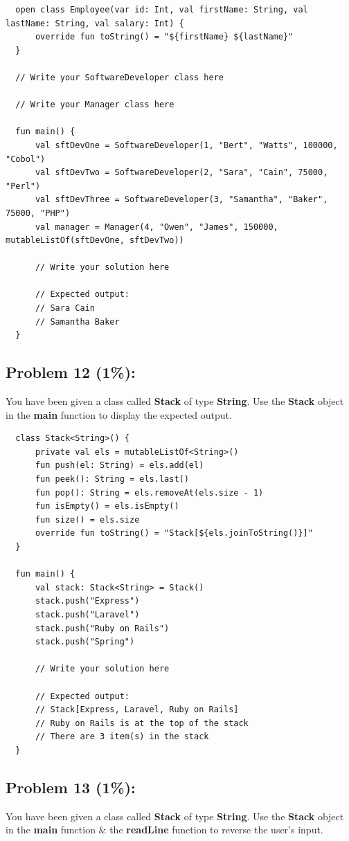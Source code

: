 \documentclass{article}
\begin{document}
\begin{verbatim}
  open class Employee(var id: Int, val firstName: String, val lastName: String, val salary: Int) {
      override fun toString() = "${firstName} ${lastName}"
  }

  // Write your SoftwareDeveloper class here

  // Write your Manager class here

  fun main() {
      val sftDevOne = SoftwareDeveloper(1, "Bert", "Watts", 100000, "Cobol")
      val sftDevTwo = SoftwareDeveloper(2, "Sara", "Cain", 75000, "Perl")
      val sftDevThree = SoftwareDeveloper(3, "Samantha", "Baker", 75000, "PHP")
      val manager = Manager(4, "Owen", "James", 150000, mutableListOf(sftDevOne, sftDevTwo))

      // Write your solution here

      // Expected output:
      // Sara Cain
      // Samantha Baker
  }
\end{verbatim}

\subsection*{Problem 12 (1\%):}
You have been given a class called \textbf{Stack} of type \textbf{String}. Use the \textbf{Stack} object in the \textbf{main} function to display the expected output.

\begin{verbatim}
  class Stack<String>() {
      private val els = mutableListOf<String>()
      fun push(el: String) = els.add(el)
      fun peek(): String = els.last()
      fun pop(): String = els.removeAt(els.size - 1)
      fun isEmpty() = els.isEmpty()
      fun size() = els.size
      override fun toString() = "Stack[${els.joinToString()}]"
  }

  fun main() {
      val stack: Stack<String> = Stack()
      stack.push("Express")
      stack.push("Laravel")
      stack.push("Ruby on Rails")
      stack.push("Spring")

      // Write your solution here

      // Expected output:
      // Stack[Express, Laravel, Ruby on Rails]
      // Ruby on Rails is at the top of the stack
      // There are 3 item(s) in the stack
  }
\end{verbatim}

\subsection*{Problem 13 (1\%):}
You have been given a class called \textbf{Stack} of type \textbf{String}. Use the \textbf{Stack} object in the \textbf{main} function \& the \textbf{readLine} function to reverse the user's input.
\end{document}
